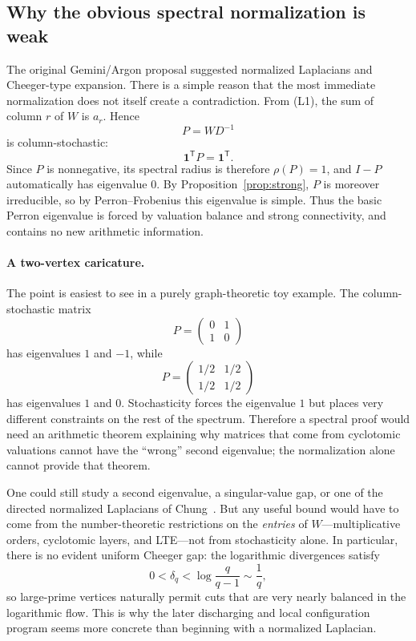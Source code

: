 \documentclass[11pt]{article}
\theoremstyle{definition}
\theoremstyle{remark}
\newcommand{\one}{\mathbf{1}}
\begin{document}
\subsection{Why the obvious spectral normalization is weak}

The original Gemini/Argon proposal suggested normalized Laplacians and
Cheeger-type expansion.  There is a simple reason that the most immediate
normalization does not itself create a contradiction.  From (L1), the sum of
column $r$ of $W$ is $a_r$.  Hence
\[
P=WD^{-1}
\]
is column-stochastic:
\[
\one^{\mathsf T}P=\one^{\mathsf T}.
\]
Since $P$ is nonnegative, its spectral radius is therefore
$\rho(P)=1$, and $I-P$ automatically has eigenvalue $0$.  By
Proposition~\ref{prop:strong}, $P$ is moreover irreducible, so by
Perron--Frobenius this eigenvalue is simple.  Thus the basic Perron
eigenvalue is forced by valuation balance and strong connectivity, and
contains no new arithmetic information.

\paragraph{A two-vertex caricature.}
The point is easiest to see in a purely graph-theoretic toy example.  The
column-stochastic matrix
\[
P=\begin{pmatrix}0&1\\[2pt]1&0\end{pmatrix}
\]
has eigenvalues $1$ and $-1$, while
\[
P=\begin{pmatrix}1/2&1/2\\[2pt]1/2&1/2\end{pmatrix}
\]
has eigenvalues $1$ and $0$.  Stochasticity forces the eigenvalue $1$ but
places very different constraints on the rest of the spectrum.  Therefore a
spectral proof would need an arithmetic theorem explaining why matrices that
come from cyclotomic valuations cannot have the ``wrong'' second eigenvalue;
the normalization alone cannot provide that theorem.

One could still study a second eigenvalue, a singular-value gap, or one of the
directed normalized Laplacians of Chung~\cite{Chung2005}.  But any useful
bound would have to come from the number-theoretic restrictions on the
\emph{entries} of $W$---multiplicative orders, cyclotomic layers, and LTE---not
from stochasticity alone.  In particular, there is no evident uniform
Cheeger gap: the logarithmic divergences satisfy
\[
0<\delta_q<\log\frac{q}{q-1}\sim\frac1q,
\]
so large-prime vertices naturally permit cuts that are very nearly balanced
in the logarithmic flow.  This is why the later discharging and local
configuration program seems more concrete than beginning with a normalized
Laplacian.
\end{document}
